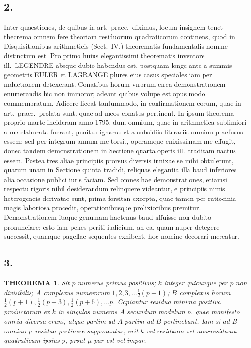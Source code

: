 \documentclass[12pt,a4paper]{article}
\theoremstyle{plain}
\newtheorem{theorem}{THEOREMA}[section]
\begin{document}
\subsection*{2.}

Inter quaestiones, de quibus in art.\ praec.\ diximus, locum insignem tenet theorema omnem fere theoriam residuorum quadraticorum continens, quod in Disquisitionibus arithmeticis (Sect.\ IV.) theorematis fundamentalis nomine distinctum est. Pro primo huius elegantissimi theorematis inventore ill.\ LEGENDRE absque dubio habendus est, postquam longe ante a summis geometris EULER et LAGRANGE plures eius casus speciales iam per inductionem detexerant. Conatibus horum virorum circa demonstrationem enumerandis hic non immoror; adeant quibus volupe est opus modo commemoratum. Adicere liceat tantummodo, in confirmationem eorum, quae in art.\ praec.\ prolata sunt, quae ad meos conatus pertinent. In ipsum theorema proprio marte incideram anno 1795, dum omnium, quae in arithmetica sublimiori a me elaborata fuerant, penitus ignarus et a subsidiis literariis omnino praefusus essem: sed per integrum annum me torsit, operamque enixissimam me effugit, donec tandem demonstrationem in Sectione quarta operis ill.\ traditam nactus essem. Postea tres aliae principiis prorsus diversis innixae se mihi obtulerunt, quarum unam in Sectione quinta tradidi, reliquas elegantia illa baud inferiores alia occasione publici iuris faciam. Sed omnes hae demonstrationes, etiamsi respectu rigoris nihil desiderandum relinquere videantur, e principiis nimis heterogeneis derivatae sunt, prima forsitan excepta, quae tamen per ratiocinia magis laboriosa procedit, operationibusque prolixioribus premitur. Demonstrationem itaque genuinam hactenus baud affuisse non dubito pronunciare: esto iam penes periti iudicium, an ea, quam nuper detegere successit, quamque pagellae sequentes exhibent, hoc nomine decorari mereatur.

\subsection*{3.}

\begin{theorem}
Sit $p$ numerus primus positivus; $k$ integer quicunque per $p$ non divisibilis; $A$ complexus numerorum $1, 2, 3, \ldots \frac{1}{2}(p-1)$; $B$ complexus horum $\frac{1}{2}(p+1), \frac{1}{2}(p+3), \frac{1}{2}(p+5), \ldots p$. Capiantur residua minima positiva productorum ex $k$ in singulos numeros $A$ secundum modulum $p$, quae manifesto omnia diversa erunt, atque partim ad $A$ partim ad $B$ pertinebunt. Iam si ad $B$ omnino $\mu$ residua pertinere supponantur, erit $k$ vel residuum vel non-residuum quadraticum ipsius $p$, prout $\mu$ par est vel impar.
\end{theorem}
\end{document}
